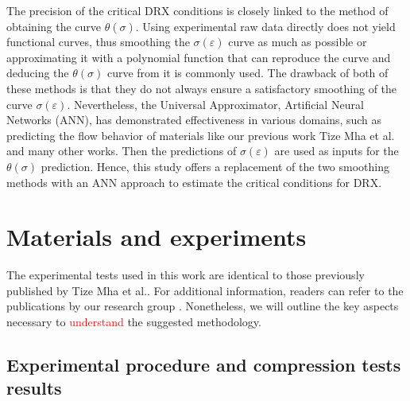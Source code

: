\documentclass[metals,article,submit,pdftex,moreauthors]{Definitions/mdpi}
\makeatletter
\DeclareRobustCommand{\eal}{et al.\@\xspace}
\makeatother
\begin{document}
The precision of the critical DRX conditions is closely linked to the method of obtaining the curve $\theta(\sigma)$.
Using experimental raw data directly does not yield functional curves, thus smoothing the $\sigma(\varepsilon)$ curve as much as possible or approximating it with a polynomial function that can reproduce the curve and deducing the $\theta(\sigma)$ curve from it is commonly used.
The drawback of both of these methods is that they do not always ensure a satisfactory smoothing of the curve $\sigma(\varepsilon)$.
Nevertheless, the Universal Approximator, Artificial Neural Networks (ANN), has demonstrated effectiveness in various domains, such as predicting the flow behavior of materials like our previous work Tize Mha \eal \cite{TizeMha-2023} and many other works.
Then the predictions of $\sigma(\varepsilon)$ are used as inputs for the $\theta(\sigma)$ prediction.
Hence, this study offers a replacement of the two smoothing methods with an ANN approach to estimate the critical conditions for DRX.

\section{Materials and experiments\label{sec:MaterialsExperiments}}

The experimental tests used in this work are identical to those previously published by Tize Mha \eal \cite{TizeMha-2023}.
For additional information, readers can refer to the publications by our research group \cite{Pantale-2021, Pantale-2023}.
Nonetheless, we will outline the key aspects necessary to \textcolor{red}{understand} the suggested methodology.

\subsection{Experimental procedure and compression tests results\label{subsec:ExperimentalProcedure}}
\end{document}
